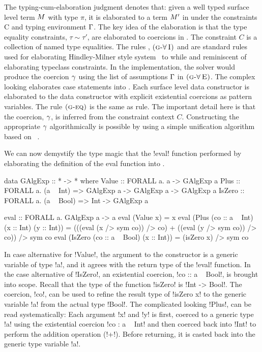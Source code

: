\documentclass[screen,nonacm,manuscript,review]{acmart} %
\begin{document}
The typing-cum-elaboration judgment
 denotes that: given a well
typed surface level term $M$ with type $\pi$, it is elaborated to a
term $M'$ in \SFC under the constraints C and typing environment
$\Gamma$. The key idea of the elaboration is that the type equality
constraints, $\tau\sim\tau'$, are elaborated to coercions in \SFC. The
constraint $C$ is a collection of named type equalities. The rules
, $\textsc{(g-\ensuremath{\mathord{\forall}}\!~I)}$ and  are
standard rules used for elaborating Hindley-Milner style
system~\cite{wadler_polymorphism_1989} to \SF while 
and  reminiscent of elaborating typeclass
constraints. In the implementation, the solver would produce the
coercion $\gamma$ using the list of assumptions $\Gamma$ in
$\textsc{(g-\ensuremath{\mathord{\forall}}\!~E)}$. The complex looking  elaborates
case statements into \SFC. Each surface level data constructor is
elaborated to the \SFC data constructor with explicit existential
coercions as pattern variables. The rule $\textsc{(g-eq)}$ is the same as
 rule. The important detail here is that the coercion,
$\gamma$, is inferred from the constraint context $C$. Constructing the
appropriate $\gamma$ algorithmically is possible by using a simple
unification algorithm based on ~\cite{lassez_unification_1988}.

We can now demystify the type magic that the !eval! function
performed by elaborating the definition of the eval function into \SFC.

\begin{minipage}[ht]{0.5\linewidth}
\begin{code}
data GAlgExp :: * -> * where
  Value  :: FORALL a. a -> GAlgExp a
  Plus   :: FORALL a. (a ~ Int) => GAlgExp a
                              -> GAlgExp a
                              -> GAlgExp a
  IsZero :: FORALL a. (a ~ Bool) => Int -> GAlgExp a
\end{code}
\end{minipage}%
\begin{minipage}[ht]{0.5\linewidth}
\begin{code}
eval :: FORALL a. GAlgExp a -> a
eval (Value x) = x
eval (Plus (co :: a ~ Int) (x :: Int) (y :: Int))
   = (((eval (x /> sym co)) /> co)
     + ((eval (y /> sym co)) /> co)) /> sym co
eval (IsZero (co :: a ~ Bool) (x :: Int))
   = (isZero x) /> sym co
\end{code}
\end{minipage}

In case alternative for !Value!, the argument to the constructor is a generic
variable of type !a!, and it agrees with the return type of the !eval!
function. In the case alternative of !IsZero!, an existential
coercion, !co :: a ~ Bool!, is brought into scope. Recall that the type of the
function !isZero! is !Int -> Bool!. The coercion, !co!, can
be used to refine the result type of !isZero x! to
the generic variable !a! from the actual type !Bool!. The complicated
looking !Plus!, can be read systematically: Each argument
!x! and !y! is first, coerced to a generic type !a! using the
existential coercion !co : a ~ Int! and then coerced back into !Int!
to perform the addition operation (!+!). Before returning, it is
casted back into the generic type variable !a!.
\end{document}
